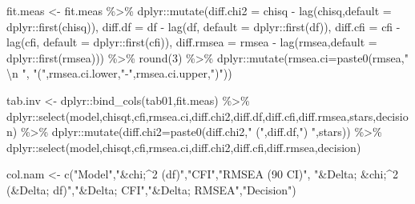 \documentclass[
  12pt,
]{article}
\newenvironment{Shaded}{\begin{snugshade}}{\end{snugshade}}
\newcommand{\AttributeTok}[1]{\textcolor[rgb]{0.40,0.45,0.13}{#1}}
\newcommand{\DecValTok}[1]{\textcolor[rgb]{0.68,0.00,0.00}{#1}}
\newcommand{\FunctionTok}[1]{\textcolor[rgb]{0.28,0.35,0.67}{#1}}
\newcommand{\NormalTok}[1]{\textcolor[rgb]{0.00,0.23,0.31}{#1}}
\newcommand{\OtherTok}[1]{\textcolor[rgb]{0.00,0.23,0.31}{#1}}
\newcommand{\SpecialCharTok}[1]{\textcolor[rgb]{0.37,0.37,0.37}{#1}}
\newcommand{\StringTok}[1]{\textcolor[rgb]{0.13,0.47,0.30}{#1}}
\begin{document}
\begin{Shaded}
\begin{Highlighting}[]
\NormalTok{fit.meas }\OtherTok{\textless{}{-}}\NormalTok{ fit.meas }\SpecialCharTok{\%\textgreater{}\%}
\NormalTok{  dplyr}\SpecialCharTok{::}\FunctionTok{mutate}\NormalTok{(}\AttributeTok{diff.chi2 =}\NormalTok{ chisq    }\SpecialCharTok{{-}} \FunctionTok{lag}\NormalTok{(chisq,}\AttributeTok{default =}\NormalTok{ dplyr}\SpecialCharTok{::}\FunctionTok{first}\NormalTok{(chisq)),}
                \AttributeTok{diff.df   =}\NormalTok{ df       }\SpecialCharTok{{-}} \FunctionTok{lag}\NormalTok{(df,   }\AttributeTok{default =}\NormalTok{ dplyr}\SpecialCharTok{::}\FunctionTok{first}\NormalTok{(df)),}
                \AttributeTok{diff.cfi  =}\NormalTok{ cfi      }\SpecialCharTok{{-}} \FunctionTok{lag}\NormalTok{(cfi,  }\AttributeTok{default =}\NormalTok{ dplyr}\SpecialCharTok{::}\FunctionTok{first}\NormalTok{(cfi)),}
                \AttributeTok{diff.rmsea   =}\NormalTok{ rmsea }\SpecialCharTok{{-}} \FunctionTok{lag}\NormalTok{(rmsea,}\AttributeTok{default =}\NormalTok{ dplyr}\SpecialCharTok{::}\FunctionTok{first}\NormalTok{(rmsea))) }\SpecialCharTok{\%\textgreater{}\%}
  \FunctionTok{round}\NormalTok{(}\DecValTok{3}\NormalTok{) }\SpecialCharTok{\%\textgreater{}\%}
\NormalTok{  dplyr}\SpecialCharTok{::}\FunctionTok{mutate}\NormalTok{(}\AttributeTok{rmsea.ci=}\FunctionTok{paste0}\NormalTok{(rmsea,}\StringTok{" }\SpecialCharTok{\textbackslash{}n}\StringTok{ "}\NormalTok{, }\StringTok{"("}\NormalTok{,rmsea.ci.lower,}\StringTok{"{-}"}\NormalTok{,rmsea.ci.upper,}\StringTok{")"}\NormalTok{))}

\NormalTok{tab.inv }\OtherTok{\textless{}{-}}\NormalTok{ dplyr}\SpecialCharTok{::}\FunctionTok{bind\_cols}\NormalTok{(tab01,fit.meas) }\SpecialCharTok{\%\textgreater{}\%}
\NormalTok{  dplyr}\SpecialCharTok{::}\FunctionTok{select}\NormalTok{(model,chisqt,cfi,rmsea.ci,diff.chi2,diff.df,diff.cfi,diff.rmsea,stars,decision) }\SpecialCharTok{\%\textgreater{}\%}
\NormalTok{  dplyr}\SpecialCharTok{::}\FunctionTok{mutate}\NormalTok{(}\AttributeTok{diff.chi2=}\FunctionTok{paste0}\NormalTok{(diff.chi2,}\StringTok{" ("}\NormalTok{,diff.df,}\StringTok{") "}\NormalTok{,stars)) }\SpecialCharTok{\%\textgreater{}\%}
\NormalTok{  dplyr}\SpecialCharTok{::}\FunctionTok{select}\NormalTok{(model,chisqt,cfi,rmsea.ci,diff.chi2,diff.cfi,diff.rmsea,decision)}


\NormalTok{col.nam }\OtherTok{\textless{}{-}} \FunctionTok{c}\NormalTok{(}\StringTok{"Model"}\NormalTok{,}\StringTok{"\&chi;\^{}2 (df)"}\NormalTok{,}\StringTok{"CFI"}\NormalTok{,}\StringTok{"RMSEA (90 CI)"}\NormalTok{,}
             \StringTok{"\&Delta; \&chi;\^{}2 (\&Delta; df)"}\NormalTok{,}\StringTok{"\&Delta; CFI"}\NormalTok{,}\StringTok{"\&Delta; RMSEA"}\NormalTok{,}\StringTok{"Decision"}\NormalTok{)}


\end{Highlighting}
\end{Shaded}
\end{document}

